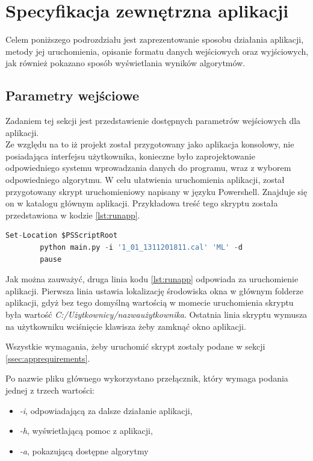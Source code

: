 \section{Specyfikacja zewnętrzna aplikacji}
Celem poniższego podrozdziału jest zaprezentowanie sposobu działania aplikacji, metody jej uruchomienia, opisanie formatu danych wejściowych oraz wyjściowych, jak również pokazano sposób wyświetlania wyników algorytmów.
\subsection{Parametry wejściowe}
\label{ssec:parameters}
Zadaniem tej sekcji jest przedstawienie dostępnych parametrów wejściowych dla aplikacji.\\
Ze względu na to iż projekt został przygotowany jako aplikacja konsolowy, nie posiadająca interfejsu użytkownika, konieczne było zaprojektowanie odpowiedniego systemu wprowadzania danych do programu, wraz z wyborem odpowiedniego algorytmu. W celu ułatwienia uruchomienia aplikacji, został przygotowany skrypt uruchomieniowy napisany w języku Powershell. Znajduje się on w katalogu głównym aplikacji. Przykładowa treść tego skryptu została przedstawiona w kodzie \ref{lst:runapp}.\par
\begin{lstlisting}[language=Python, caption=Skrypt uruchomieniowy aplikacji, label={lst:runapp}]
        Set-Location $PSScriptRoot
        python main.py -i '1_01_1311201811.cal' 'ML' -d
        pause
\end{lstlisting}
Jak można zauważyć, druga linia kodu \ref{lst:runapp} odpowiada za uruchomienie aplikacji. Pierwsza linia ustawia lokalizację środowiska okna w głównym folderze aplikacji, gdyż bez tego domyślną wartością w momecie uruchomienia skryptu była wartość \emph{C:/Użytkownicy/nazwaużytkownika}. Ostatnia linia skryptu wymusza na użytkowniku wciśnięcie klawisza żeby zamknąć okno aplikacji.\par
Wszystkie wymagania, żeby uruchomić skrypt zostały podane w sekcji \ref{ssec:apprequirements}.\par
Po nazwie pliku głównego wykorzystano przełącznik, który wymaga podania jednej z trzech wartości:
\begin{itemize}
        \item \emph{-i}, odpowiadającą za dalsze działanie aplikacji,
        \item \emph{-h}, wyświetlającą pomoc z aplikacji,
        \item \emph{-a}, pokazującą dostępne algorytmy
\end{itemize}
